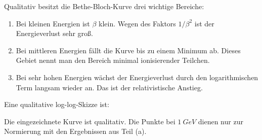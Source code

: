 \documentclass[11pt,a4paper]{scrartcl}
\newcommand{\dd}{\,\mathrm{d}}
\begin{document}
\begin{enumerate}[label=(\alph*)]
            \begin{calculationbox}
                Qualitativ besitzt die Bethe-Bloch-Kurve drei wichtige Bereiche:
                \begin{enumerate}[label=\arabic*.]
                    \item Bei kleinen Energien ist $\beta$ klein. Wegen des Faktors $1/\beta^2$
                    ist der Energieverlust sehr groß.
                    \item Bei mittleren Energien fällt die Kurve bis zu einem Minimum ab. Dieses
                    Gebiet nennt man den Bereich minimal ionisierender Teilchen.
                    \item Bei sehr hohen Energien wächst der Energieverlust durch den logarithmischen
                    Term langsam wieder an. Das ist der relativistische Anstieg.
                \end{enumerate}

                \begin{calculationbox}
                    Eine qualitative log-log-Skizze ist:
                    \begin{center}
                    \end{center}
                    Die eingezeichnete Kurve ist qualitativ. Die Punkte bei $\SI{1}{GeV}$ dienen
                    nur zur Normierung mit den Ergebnissen aus Teil (a).
                \end{calculationbox}
            \end{calculationbox}


\end{enumerate}
\end{document}
